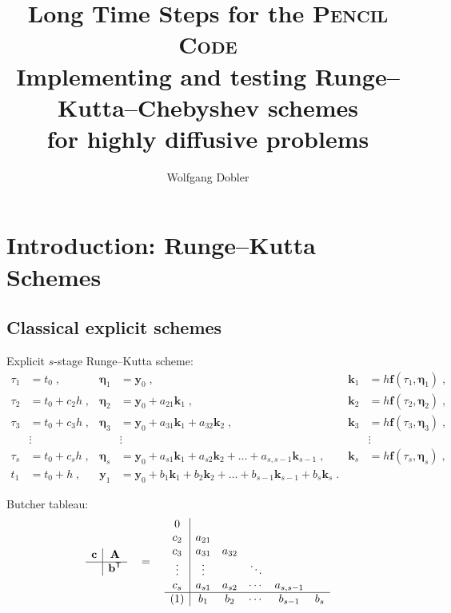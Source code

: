 \documentclass[\mydriver,12pt,twoside,notitlepage]{article}
\title{Long Time Steps for the \textsc{Pencil Code}\\[1.5ex]
  {\large Implementing and testing Runge--Kutta--Chebyshev schemes\\
    for highly diffusive problems}
}
\author{Wolfgang Dobler}
\newcommand{\Av}      {\mathbf{A}}
\newcommand{\bv}      {\mathbf{b}}
\newcommand{\cv}      {\mathbf{c}}
\newcommand{\etav}    {\bm{\eta}}
\newcommand{\fv}      {\mathbf{f}}
\newcommand{\kv}      {\mathbf{k}}
\newcommand{\yv}{\mathbf{y}}
\begin{document}
\thispagestyle{empty}

\maketitle

\clearpage
\tableofcontents
\clearpage

\section{Introduction: Runge--Kutta Schemes}

\subsection{Classical explicit schemes}
Explicit $s$-stage Runge--Kutta scheme:
\begin{align}
  \tau_1 &= t_0 \; ,
            & \etav_1 &= \yv_0 \; ,
                         & \kv_1 &= h\fv(\tau_1, \etav_1) \; ,\\
  \tau_2 &= t_0 + c_2 h \; ,
            & \etav_2 &= \yv_0 + a_{21} \kv_1 \; ,
                         & \kv_2 &= h\fv(\tau_2, \etav_2) \; ,\\
  \tau_3 &= t_0 + c_3 h \; ,
            & \etav_3 &= \yv_0 + a_{31} \kv_1 + a_{32} \kv_2 \; ,
                         & \kv_3 &= h\fv(\tau_3, \etav_3) \; ,\\
  & \vdots &  & \vdots  &  &\vdots \nonumber \\
  \tau_s &= t_0 + c_s h \; ,
            & \etav_s &= \yv_0 + a_{s1} \kv_1 + a_{s2} \kv_2
             + \ldots + a_{s,s-1} \kv_{s-1} \; ,
                              & \kv_s &= h\fv(\tau_s, \etav_s) \; ,\\
  t_1 &= t_0 + h \; ,
            & \yv_1   &= \yv_0 + b_1 \kv_1 + b_2 \kv_2
                         + \ldots + b_{s-1} \kv_{s-1} + b_{s} \kv_{s} \; .
\end{align}


Butcher tableau:
\begin{equation}
  \begin{array}{c|c}
    \cv & \Av \\
    \hline
        & \bv^{\mathsf T}
  \end{array}
  \quad=\quad
  \begin{array}{c|ccccc}
    0                                                 \\
    c_2    & a_{21}                                   \\
    c_3    & a_{31} & a_{32}                          \\
    \vdots & \vdots &        & \ddots &               \\
    c_s    & a_{s1} & a_{s2} & \cdots & a_{s,s-1}     \\
    \hline
    (1)    & b_1    & b_2    & \cdots & b_{s-1} & b_s
  \end{array}
\end{equation}
\end{document}
